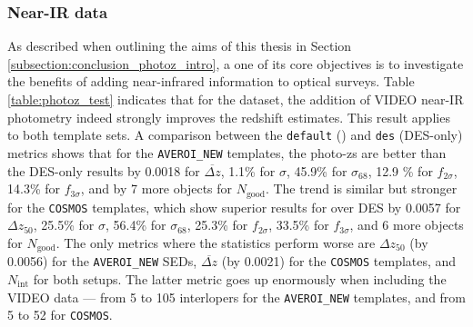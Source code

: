 


\subsubsection{Near-IR data}\label{subsubsection:near_IR}
As described when outlining the aims of this thesis in Section \ref{subsection:conclusion_photoz_intro}, a one of its core objectives is to investigate the benefits of adding near-infrared information to optical surveys. Table \ref{table:photoz_test} indicates that for the \DESVIDEO dataset, the addition of VIDEO near-IR photometry indeed strongly improves the redshift estimates. This result applies to both template sets. A comparison between the \texttt{default} (\DESVIDEO) and \texttt{des} (DES-only) metrics shows that for the \texttt{AVEROI\_NEW} templates, the \DESVIDEO photo-zs are better than the DES-only results by 0.0018 for $\overbar{\Delta z}$, 1.1\% for $\sigma$, 45.9\% for $\sigma_{68}$, 12.9 \% for $f_{2\sigma}$, 14.3\% for $f_{3\sigma}$, and by 7 more objects for $N_{\mathrm{good}}$. The trend is similar but stronger for the \texttt{COSMOS} templates, which show superior results for \DESVIDEO over DES by 0.0057 for $\Delta z_{50}$, 25.5\% for $\sigma$, 56.4\% for $\sigma_{68}$, 25.3\% for $f_{2\sigma}$, 33.5\% for $f_{3\sigma}$, and 6 more objects for $N_{\mathrm{good}}$. The only metrics where the \DESVIDEO statistics perform worse are $\Delta z_{50}$ (by 0.0056) for the \texttt{AVEROI\_NEW} SEDs, $\overbar{\Delta z}$ (by 0.0021) for the \texttt{COSMOS} templates, and $N_{\mathrm{int}}$ for both setups. The latter metric goes up enormously when including the VIDEO data --- from 5 to 105 interlopers for the \texttt{AVEROI\_NEW} templates, and from 5 to 52 for \texttt{COSMOS}. \par

